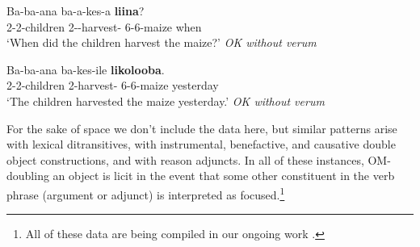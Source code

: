 \documentclass[output=paper]{langscibook}
\begin{document}
\ea
\begin{xlist}

\gll Ba-ba-ana ba-a-kes-a  \textbf{liina}? \\
2-2-children 2\Sm-\Om-harvest-\Fv{} 6-6-maize when \\
\glt `When did the children harvest the maize?’ \textit{OK without verum}

\gll Ba-ba-ana ba-kes-ile  \textbf{likolooba}. \\
2-2-children 2\Om-harvest-\Pfv{} 6-6-maize yesterday \\
\glt `The children harvested the maize yesterday.’ \textit{OK without verum}

\end{xlist}
\z

For the sake of space we don't include the data here, but similar patterns arise with lexical ditransitives, with instrumental, benefactive, and causative double object constructions, and with reason adjuncts. In all of these instances, OM-doubling an object is licit in the event that some other constituent in the verb phrase (argument or adjunct) is interpreted as focused.\footnote{All of these data are being compiled in our ongoing work \citep{SikukuDiercks2020BukusuOmBook}.}







\end{document}
